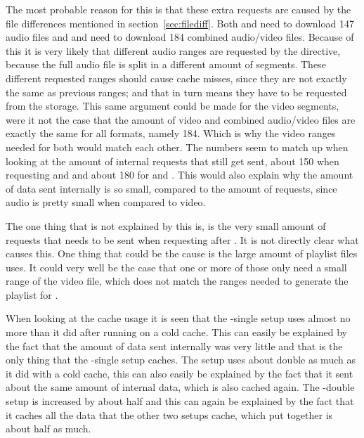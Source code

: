 \documentclass[twoside,openright]{uva-bachelor-thesis}
\begin{document}
The most probable reason for this is that these extra requests
are caused by the file differences mentioned in section~\ref{sec:filediff}.
Both \dash and \iss need to download 147 audio files and \hds and \hls need to
download 184 combined audio/video files. Because of this it is very likely that
different audio ranges are requested by the \ipplong directive, because the full
audio file is split in a different amount of segments. These different requested
ranges should cause cache misses, since they are not exactly the same as
previous ranges; and that in turn means they have to be requested from the
storage. This same argument could be made for the video segments, were it not
the case that the amount of video and combined audio/video files are exactly the
same for all formats, namely 184.  Which is why the video ranges needed for
both would match each other. The numbers seem to match up when looking at the
amount of internal requests that still get sent, about 150 when requesting \dash
and \iss and about 180 for \hds and \hls.  This would also explain why the
amount of data sent internally is so small, compared to the amount of requests,
since audio is pretty small when compared to video.

The one thing that is not explained by this is, is the very small amount of
requests that needs to be sent when requesting \hls after \hds. It is not
directly clear what causes this. One thing that could be the cause is the large
amount of playlist files \hls uses. It could very well be the case that one or
more of those only need a small range of the video file, which does not match
the ranges needed to generate the playlist for \hds.

When looking at the cache usage it is seen that the \lt-single setup uses almost
no more than it did after running on a cold cache. This can easily be explained
by the fact that the amount of data sent internally was very little and that is
the only thing that the \lt-single setup caches. The \cdn setup uses about
double as much as it did with a cold cache, this can also easily be explained by
the fact that it sent about the same amount of internal data, which is also
cached again. The \lt-double setup is increased by about half and this can again
be explained by the fact that it caches all the data that the other two setups
cache, which put together is about half as much.
\end{document}
